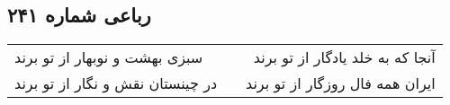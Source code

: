 \begin{center}
\section*{رباعی شماره ۲۴۱}
\label{sec:sh241}
\begin{longtable}{l p{0.5cm} r}
سبزی بهشت و نوبهار از تو برند
&&
آنجا که به خلد یادگار از تو برند
\\
در چینستان نقش و نگار از تو برند
&&
ایران همه فال روزگار از تو برند
\\
\end{longtable}
\end{center}
